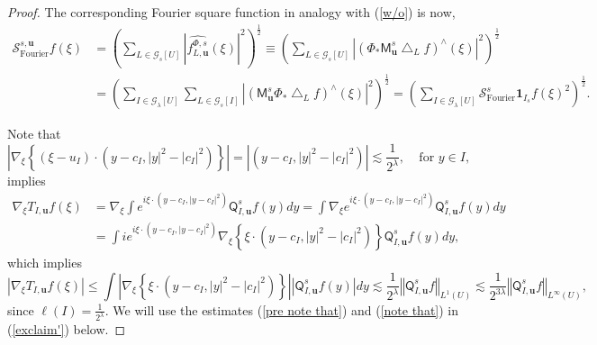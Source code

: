 \documentclass{amsart}%
\theoremstyle{plain}
\numberwithin{equation}{section}
\begin{document}
\begin{proof}
The corresponding Fourier square function in analogy with (\ref{w/o}) is now,%
\begin{align*}
\mathcal{S}_{\operatorname*{Fourier}}^{s,\mathbf{u}}f\left(  \xi\right)   &
=\left(  \sum_{L\in\mathcal{G}_{s}\left[  U\right]  }\left\vert \widehat
{f_{L,\mathbf{u}}^{\Phi,s}}\left(  \xi\right)  \right\vert ^{2}\right)
^{\frac{1}{2}}\equiv\left(  \sum_{L\in\mathcal{G}_{s}\left[  U\right]
}\left\vert \left(  \Phi_{\ast}\mathsf{M}_{\mathbf{u}}^{s}\bigtriangleup
_{L}f\right)  ^{\wedge}\left(  \xi\right)  \right\vert ^{2}\right)  ^{\frac
{1}{2}}\\
&  =\left(  \sum_{I\in\mathcal{G}_{\lambda}\left[  U\right]  }\sum
_{L\in\mathcal{G}_{s}\left[  I\right]  }\left\vert \left(  \mathsf{M}%
_{\mathbf{u}}^{s}\Phi_{\ast}\bigtriangleup_{L}f\right)  ^{\wedge}\left(
\xi\right)  \right\vert ^{2}\right)  ^{\frac{1}{2}}=\left(  \sum
_{I\in\mathcal{G}_{\lambda}\left[  U\right]  }\mathcal{S}%
_{\operatorname*{Fourier}}^{s}\mathbf{1}_{I_{s}}f\left(  \xi\right)
^{2}\right)  ^{\frac{1}{2}}.
\end{align*}


Note that%
\[
\left\vert \nabla_{\xi}\left\{  \left(  \xi-u_{I}\right)  \cdot\left(
y-c_{I},\left\vert y\right\vert ^{2}-\left\vert c_{I}\right\vert ^{2}\right)
\right\}  \right\vert =\left\vert \left(  y-c_{I},\left\vert y\right\vert
^{2}-\left\vert c_{I}\right\vert ^{2}\right)  \right\vert \lesssim\frac
{1}{2^{\lambda}},\ \ \ \ \ \text{for }y\in I,
\]
implies%
\begin{align}
\nabla_{\xi}T_{I,\mathbf{u}}f\left(  \xi\right)   &  =\nabla_{\xi}\int
e^{i\xi\cdot\left(  y-c_{I},\left\vert y-c_{I}\right\vert ^{2}\right)
}\mathsf{Q}_{I,\mathbf{u}}^{s}f\left(  y\right)  dy=\int\nabla_{\xi}%
e^{i\xi\cdot\left(  y-c_{I},\left\vert y-c_{I}\right\vert ^{2}\right)
}\mathsf{Q}_{I,\mathbf{u}}^{s}f\left(  y\right)  dy\label{pre note that}\\
&  =\int ie^{i\xi\cdot\left(  y-c_{I},\left\vert y-c_{I}\right\vert
^{2}\right)  }\nabla_{\xi}\left\{  \xi\cdot\left(  y-c_{I},\left\vert
y\right\vert ^{2}-\left\vert c_{I}\right\vert ^{2}\right)  \right\}
\mathsf{Q}_{I,\mathbf{u}}^{s}f\left(  y\right)  dy,\nonumber
\end{align}
which implies%
\begin{equation}
\left\vert \nabla_{\xi}T_{I,\mathbf{u}}f\left(  \xi\right)  \right\vert
\leq\int\left\vert \nabla_{\xi}\left\{  \xi\cdot\left(  y-c_{I},\left\vert
y\right\vert ^{2}-\left\vert c_{I}\right\vert ^{2}\right)  \right\}
\right\vert \left\vert \mathsf{Q}_{I,\mathbf{u}}^{s}f\left(  y\right)
\right\vert dy\lesssim\frac{1}{2^{\lambda}}\left\Vert \mathsf{Q}%
_{I,\mathbf{u}}^{s}f\right\Vert _{L^{1}\left(  U\right)  }\lesssim\frac
{1}{2^{3\lambda}}\left\Vert \mathsf{Q}_{I,\mathbf{u}}^{s}f\right\Vert
_{L^{\infty}\left(  U\right)  }, \label{note that}%
\end{equation}
since $\ell\left(  I\right)  =\frac{1}{2^{\lambda}}$. We will use the
estimates (\ref{pre note that}) and (\ref{note that}) in (\ref{exclaim'}) below.


\end{proof}
\end{document}
